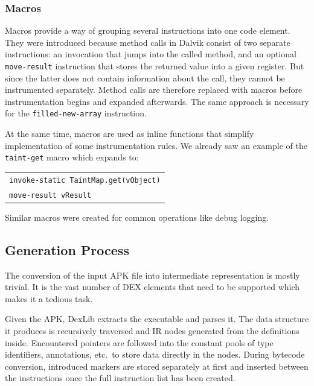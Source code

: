 \documentclass[12pt,twoside,notitlepage]{report}
\newcommand{\centerbox}[1] {
	\begin{center}
	\begin{footnotesize}
	\begin{tabular}{l}
		#1
	\end{tabular}
	\end{footnotesize}
	\end{center}
}
\newcommand{\asm}[1] {\texttt{#1}}
\begin{document}
\subsubsection{Macros}
\label{section:Code_Macros}

Macros provide a way of grouping several instructions into one code element. They were introduced because method calls in Dalvik consist of two separate instructions: an invocation that jumps into the called method, and an optional \verb$move-result$ instruction that stores the returned value into a given register. But since the latter does not contain information about the call, they cannot be instrumented separately. Method calls are therefore replaced with macros before instrumentation begins and expanded afterwards. The same approach is necessary for the \verb$filled-new-array$ instruction.

At the same time, macros are used as inline functions that simplify implementation of some instrumentation rules. We already saw an example of the \verb$taint-get$ macro which expands to:
	\centerbox{
		\asm{invoke-static TaintMap.get(vObject)} \\
		\asm{move-result vResult}
	}
Similar macros were created for common operations like debug logging.

\subsection{Generation Process}

The conversion of the input APK file into intermediate representation is mostly trivial. It is the vast number of DEX elements that need to be supported which makes it a tedious task. 

Given the APK, DexLib extracts the executable and parses it. The data structure it produces is recursively traversed and IR nodes generated from the definitions inside. Encountered pointers are followed into the constant pools of type identifiers, annotations, etc.\ to store data directly in the nodes. During bytecode conversion, introduced markers are stored separately at first and inserted between the instructions once the full instruction list has been created.


\end{document}
